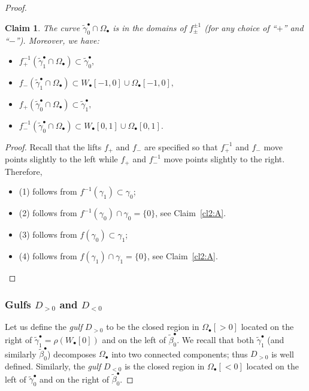 \documentclass[]{amsart}
\newcommand\oseq{{\bullet}}
\newcommand\inn{{\Omega}}
\newcommand\wbeta{{\widetilde \beta}}
\newcommand\wgamma{{\widetilde \gamma}}
\newtheorem{claim2}{Claim}
\theoremstyle{remark}
\numberwithin{equation}{section}
\theoremstyle{definition}
\begin{document}
\begin{proof}
\begin{claim2}
\label{cl2:B} The curve $\wgamma^{\oseq}_{0}\cap \inn_{\oseq }$ is in the domains of $f_{\pm}^{\pm1}$ (for any choice of ``$+$'' and ``$-$''). Moreover, we have:
\begin{itemize}
\item[(1)] $ f_+^{-1}\left(\wgamma^{\oseq}_{1}\cap \inn_{\oseq } \right) \subset \wgamma^\oseq_0,$
\item[(2)]   $ f_-\left(\wgamma^{\oseq}_{1}\cap \inn_{\oseq } \right)  \subset W_\oseq[-1,0]\cup \inn_\oseq[-1,0],$
\item[(3)] $  f_+\left(\wgamma^{\oseq}_{0}\cap \inn_{\oseq } \right)  \subset \wgamma^\oseq_1,$ 
\item[(4)]  $f_-^{-1}\left(\wgamma^{\oseq}_{0}\cap \inn_{\oseq } \right)  \subset W_\oseq[0,1]\cup \inn_\oseq[0,1].$ 
\end{itemize}
\end{claim2}
\begin{proof}
Recall that the lifts $f_+$ and $f_-$ are specified so that $f_+^{-1}$ and $f_-$ move points slightly to the left while $f_+$ and $f_-^{-1}$ move points slightly to the right. Therefore, 
\begin{itemize}
\item (1) follows from $f^{-1}(\gamma_1)\subset \gamma_0$;
\item (2) follows from $f^{-1}(\gamma_0)\cap \gamma_0=\{0\}$, see Claim~\ref{cl2:A}.
\item (3) follows from $f(\gamma_0)\subset \gamma_1$;
\item (4) follows from $f(\gamma_1)\cap \gamma_1=\{0\}$, see Claim~\ref{cl2:A}.
\end{itemize}
\end{proof}

\subsubsection{Gulfs $D_{>0}$ and $D_{<0}$}
Let us define the \emph{gulf} $D_{> 0}$ to be the closed region in $\inn_{\oseq }[> 0]$ located on the right of $\wgamma^{\oseq}_1=\rho(W_{\oseq }[0])$ and on the left of $\wbeta^{\oseq}_0$. We recall that both $\wgamma^{\oseq}_1$ (and similarly $\wbeta^{\oseq}_0$) decomposes $\inn_\oseq$ into two connected  components; thus $D_{> 0}$  is well defined.  Similarly, the \emph{gulf} $D_{<0}$ is the closed region in $\inn_{\oseq }[<0]$ located on the left of $\wgamma^{\oseq}_0$ and on the right of $ \wbeta^{\oseq}_0$. 





\end{proof}
\end{document}
